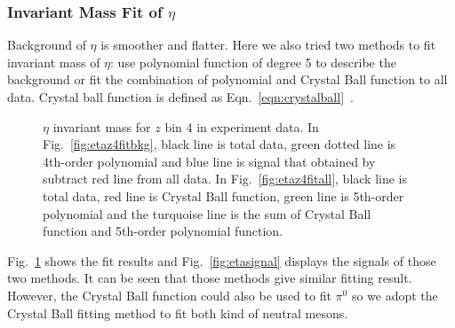 \subsubsection{\texorpdfstring{Invariant Mass Fit of $\eta$}{eta fit} }
\label{sec:etafitsection}
Background of $\eta$ is smoother and flatter. Here we also tried two methods to fit invariant mass of $\eta$: use polynomial function of degree 5 to describe the background or fit the combination of polynomial and Crystal Ball function to all data. Crystal ball function is defined as Eqn.~\ref{eqn:crystalball}~\cite{CrystalBallFunc}.
  
\begin{figure}[h]
\centering     %
{}
\caption{$\eta$ invariant mass for $z$ bin 4 in experiment data. In Fig.~\ref{fig:etaz4fitbkg}, black line is total data, green dotted line is 4th-order polynomial and blue line is signal that obtained by subtract red line from all data. In Fig.~\ref{fig:etaz4fitall}, black line is total data, red line is Crystal Ball function, green line is 5th-order polynomial and the turquoise line is the sum of Crystal Ball function and 5th-order polynomial function.}
\label{fig:eta_fit}
\end{figure}

 Fig.~\ref{fig:eta_fit} shows the fit results and Fig.~\ref{fig:etasignal} displays the signals of those two methods. It can be seen that those methods give similar fitting result. However, the Crystal Ball function could also be used to fit $\pi^0$ so we adopt the Crystal Ball fitting method to fit both kind of neutral mesons.

